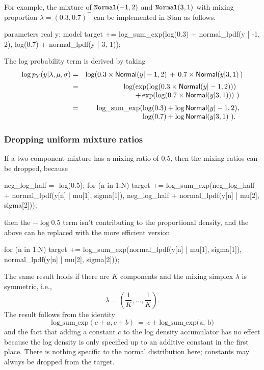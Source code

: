 For example, the mixture of $\code{Normal}(-1,2)$ and
$\code{Normal}(3,1)$ with mixing proportion $\lambda =
(0.3,0.7)^{\top}$ can be implemented in Stan as follows.
%
\begin{stancode}
parameters {
  real y;
}
model {
  target += log_sum_exp(log(0.3) + normal_lpdf(y | -1, 2),
                        log(0.7) + normal_lpdf(y | 3, 1));
}
\end{stancode}
%
The log probability term is derived by taking
%
\begin{eqnarray*}
\log p_Y(y | \lambda,\mu,\sigma) & = & \log\!\left( 0.3 \times \distro{Normal}(y|-1,2) \, + \,
  0.7 \times
  \distro{Normal}(y|3,1) \, \right)
\\[2pt]
& = & \log(\hspace*{-5pt} \begin{array}[t]{l}
                 \exp(\log(0.3 \times \distro{Normal}(y|-1,2))) \\
                 + \exp(\log(0.7 \times \distro{Normal}(y|3,1))) \ )
              \end{array}
\\[2pt]
& = & \mbox{log\_sum\_exp}(\hspace*{-5pt}\begin{array}[t]{l}
                         \log(0.3) + \log \distro{Normal}(y|-1,2),
                         \\                  
                         \log(0.7) + \log \distro{Normal}(y|3,1) \ ).
                       \end{array}
\end{eqnarray*}
%

\subsubsection{Dropping uniform mixture ratios}

If a two-component mixture has a mixing ratio of 0.5, then the mixing
ratios can be dropped, because
%
\begin{stancode}
neg_log_half = -log(0.5);
for (n in 1:N)
  target
    += log_sum_exp(neg_log_half + normal_lpdf(y[n] | mu[1], sigma[1]),
                   neg_log_half + normal_lpdf(y[n] | mu[2], sigma[2]));
\end{stancode}
%
then the $-\log 0.5$ term isn't contributing to the proportional
density, and the above can be replaced with the more efficient version
%
\begin{stancode}
for (n in 1:N)
  target += log_sum_exp(normal_lpdf(y[n] | mu[1], sigma[1]),
                        normal_lpdf(y[n] | mu[2], sigma[2]));
\end{stancode}
%
The same result holds if there are $K$ components and the mixing
simplex $\lambda$ is symmetric, i.e.,
%
\[
\lambda = \left( \frac{1}{K},   \ldots, \frac{1}{K} \right).
\]
%
The result follows from the identity
%
\[
\mbox{log\_sum\_exp}(c + a, c + b)
\ = \ 
c + \mbox{log\_sum\_exp(a, b)}
\]
%
and the fact that adding a constant $c$ to the log density accumulator
has no effect because the log density is only specified up to an
additive constant in the first place.  There is nothing specific to
the normal distribution here; constants may always be dropped from the
target.


